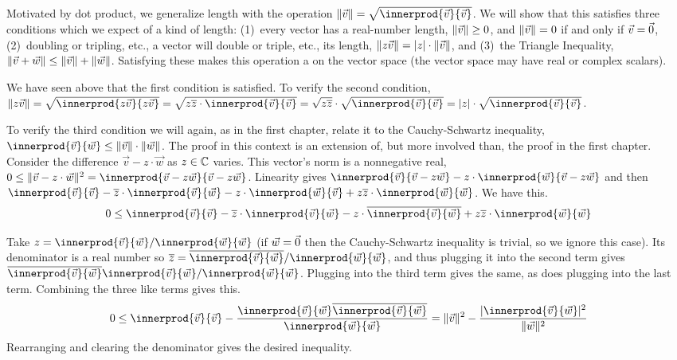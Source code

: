 Motivated by dot product, we generalize length with the operation 
$\norm{\vec{v}}=\sqrt{\innerprod{\vec{v}}{\vec{v}}}$.
We will show that this satisfies 
three conditions which we expect of a kind of length: 
(1)~every vector has a real-number length, $\lVert\vec{v}\rVert\geq 0$, 
and $\lVert\vec{v}\rVert= 0$ if and only if $\vec{v}=\vec{0}$, 
(2)~doubling or tripling, etc., a vector will double or triple, etc., 
its length, $\lVert z\vec{v}\rVert=\lvert z\rvert\cdot\lVert\vec{v}\rVert$, and 
(3)~the Triangle Inequality, 
$\lVert\vec{v}+\vec{w}\rVert\leq\lVert\vec{v}\rVert+\lVert\vec{w}\rVert$.
Satisfying these makes this operation 
a  on the
vector space (the vector space may have real or complex scalars).

We have seen above that the first condition is satisfied.
To verify the second condition, 
$\norm{z\vec{v}}=\sqrt{\innerprod{z\vec{v}}{z\vec{v}}}
=\sqrt{z\compconj{z}\cdot\innerprod{\vec{v}}{\vec{v}}}
=\sqrt{z\compconj{z}}\cdot\sqrt{\innerprod{\vec{v}}{\vec{v}}}
=\absval{z}\cdot\sqrt{\innerprod{\vec{v}}{\vec{v}}}$.

To verify the third condition we will again, as in the first
chapter, relate it to the Cauchy-Schwartz inequality,
$\innerprod{\vec{v}}{\vec{w}}\leq \norm{\vec{v}}\cdot\norm{\vec{w}}$.
The proof in this context is an extension of, but more involved than, the 
proof in the first chapter. 
Consider the difference $\vec{v}-z\cdot\vec{w}$ as $z\in\mathbb{C}$ varies.
This vector's norm is a nonnegative real,
$0\leq \norm{\vec{v}-z\cdot\vec{w}}^2
   =\innerprod{\vec{v}-z\vec{w}}{\vec{v}-z\vec{w}}$.
Linearity gives
$\innerprod{\vec{v}}{\vec{v}-z\vec{w}}
  -z\cdot\innerprod{\vec{w}}{\vec{v}-z\vec{w}}$
and then
$\innerprod{\vec{v}}{\vec{v}}
  -\compconj{z}\cdot\innerprod{\vec{v}}{\vec{w}}
  -z\cdot\innerprod{\vec{w}}{\vec{v}}
  +z\compconj{z}\cdot\innerprod{\vec{w}}{\vec{w}}$.
We have this.
\begin{equation*}
 0
  \leq\innerprod{\vec{v}}{\vec{v}}
  -\compconj{z}\cdot\innerprod{\vec{v}}{\vec{w}}
  -z\cdot\compconj{\innerprod{\vec{v}}{\vec{w}}}
  +z\compconj{z}\cdot\innerprod{\vec{w}}{\vec{w}}
\end{equation*}

Take 
$z=\innerprod{\vec{v}}{\vec{w}}/\innerprod{\vec{w}}{\vec{w}}$
(if $\vec{w}=\vec{0}$ then the Cauchy-Schwartz inequality is trivial, so we
ignore this case).
Its denominator is a real number so
$\compconj{z}=\compconj{\innerprod{\vec{v}}{\vec{w}}}/\innerprod{\vec{w}}{\vec{w}}$,
and thus plugging it into the second term gives 
$\compconj{\innerprod{\vec{v}}{\vec{w}}}\innerprod{\vec{v}}{\vec{w}}/\innerprod{\vec{w}}{\vec{w}}$.
Plugging into the third term gives the same,
as does plugging into the last term.
Combining the three like terms gives this.
\begin{equation*}
 0
  \leq\innerprod{\vec{v}}{\vec{v}}
  -\frac{\innerprod{\vec{v}}{\vec{w}}\compconj{\innerprod{\vec{v}}{\vec{w}}}}{\innerprod{\vec{w}}{\vec{w}}}
  =\norm{\vec{v}}^2
  -\frac{\absval{\innerprod{\vec{v}}{\vec{w}}}^2}{\norm{\vec{w}}^2}
\end{equation*}
Rearranging and clearing the denominator gives the desired 
inequality.

